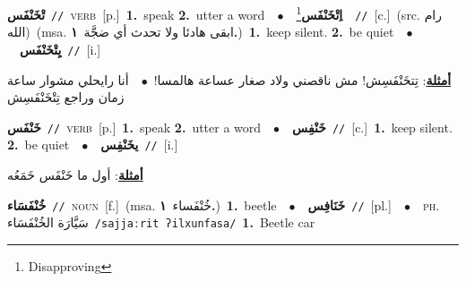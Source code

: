 \documentclass[10pt,a4paper,twoside]{article} %
\begin{document}
\begin{multicols}{2}
{\setlength\topsep{0pt}\textbf{\foreignlanguage{arabic}{تْخَنْفَس}}\ {\color{gray}\texttt{//}\color{black}}\ \textsc{verb}\ [p.]\ \textbf{1.}~speak  \textbf{2.}~utter a word\ \ $\bullet$\ \ \setlength\topsep{0pt}\textbf{\foreignlanguage{arabic}{اِتْخَنْفَس}}\footnote{Disapproving}\ \ {\color{gray}\texttt{//}\color{black}}\ [c.]\ (src. \color{gray}\foreignlanguage{arabic}{رام الله}\color{black})\ \color{gray}(msa. \foreignlanguage{arabic}{ابقى هادئا ولا تحدث أي ضجَّة}~\foreignlanguage{arabic}{\textbf{١.}})\color{black}\ \textbf{1.}~keep silent.  \textbf{2.}~be quiet\ \ $\bullet$\ \ \setlength\topsep{0pt}\textbf{\foreignlanguage{arabic}{يِتْخَنْفَس}}\ {\color{gray}\texttt{//}\color{black}}\ [i.]\  \begin{flushright}\color{gray}\foreignlanguage{arabic}{\textbf{\underline{\foreignlanguage{arabic}{أمثلة}}}: تِتخَنْفَسِش! مش ناقصني ولاد صغار عساعة هالمسا!\ $\bullet$\ \  أنا رايحلي مشوار ساعة زمان وراجع تِتْخَنْفَسِش}\end{flushright}\color{black}} \vspace{2mm}

{\setlength\topsep{0pt}\textbf{\foreignlanguage{arabic}{خَنْفَس}}\ {\color{gray}\texttt{//}\color{black}}\ \textsc{verb}\ [p.]\ \textbf{1.}~speak  \textbf{2.}~utter a word\ \ $\bullet$\ \ \setlength\topsep{0pt}\textbf{\foreignlanguage{arabic}{خَنْفِس}}\ {\color{gray}\texttt{//}\color{black}}\ [c.]\ \textbf{1.}~keep silent.  \textbf{2.}~be quiet\ \ $\bullet$\ \ \setlength\topsep{0pt}\textbf{\foreignlanguage{arabic}{يخَنْفِس}}\ {\color{gray}\texttt{//}\color{black}}\ [i.]\  \begin{flushright}\color{gray}\foreignlanguage{arabic}{\textbf{\underline{\foreignlanguage{arabic}{أمثلة}}}: أول ما خَنْفَس خَمَعُه}\end{flushright}\color{black}} \vspace{2mm}

{\setlength\topsep{0pt}\textbf{\foreignlanguage{arabic}{خُنْفَسَاء}}\ {\color{gray}\texttt{//}\color{black}}\ \textsc{noun}\ [f.]\ \color{gray}(msa. \foreignlanguage{arabic}{خُنْفَساء}~\foreignlanguage{arabic}{\textbf{١.}})\color{black}\ \textbf{1.}~beetle\ \ $\bullet$\ \ \setlength\topsep{0pt}\textbf{\foreignlanguage{arabic}{خَنَافِس}}\ {\color{gray}\texttt{//}\color{black}}\ [pl.]\ \ $\bullet$\ \ \textsc{ph.} \color{gray} \foreignlanguage{arabic}{سَيَّارَة الخُنْفَسَاء}\color{black}\ {\color{gray}\texttt{/{\sffamily sajjaːrit ʔilxunfasa}/}\color{black}}\ \textbf{1.}~Beetle car\ } \vspace{2mm}


\end{multicols}
\end{document}
